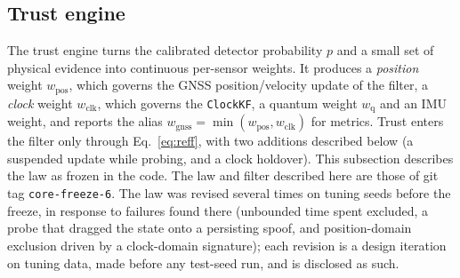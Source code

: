 \documentclass[journal]{IEEEtran}
\begin{document}
\subsection{Trust engine}
\label{sec:trustlaw}
The trust engine turns the calibrated detector probability $p$ and a small set of physical evidence into
continuous per-sensor weights. It produces a \emph{position} weight $w_{\mathrm{pos}}$, which governs the
GNSS position/velocity update of the filter, a \emph{clock} weight $w_{\mathrm{clk}}$, which governs the
\texttt{ClockKF}, a quantum weight $w_{\mathrm{q}}$ and an IMU weight, and reports the alias
$w_{\mathrm{gnss}} = \min(w_{\mathrm{pos}}, w_{\mathrm{clk}})$ for metrics. Trust enters the filter only
through Eq.~\eqref{eq:reff}, with two additions described below (a suspended update while probing, and a
clock holdover). This subsection describes the law as frozen in the code. The law and filter described here are those of git tag \texttt{core-freeze-6}.
The law was revised several times on tuning seeds before the freeze, in response to failures found there
(unbounded time spent excluded, a probe that dragged the state onto a persisting spoof, and
position-domain exclusion driven by a clock-domain signature); each revision is a design iteration on
tuning data, made before any test-seed run, and is disclosed as such.
\end{document}
